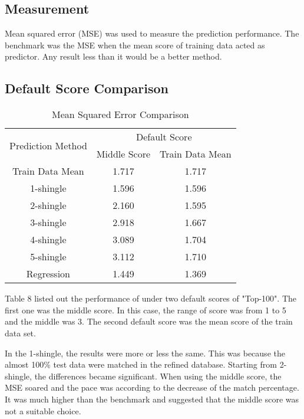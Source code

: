 \subsection{Measurement}
Mean squared error (MSE) was used to measure the prediction performance. The benchmark was the MSE when the mean score of training data acted as predictor. Any result less than it would be a better method.

\subsection{Default Score Comparison}

\begin{table}[H]
\caption{Mean Squared Error Comparison}
		\begin{tabular}{ccc}
			\toprule
				\multirow{2}{*}{Prediction Method} &
				\multicolumn{2}{c}{Default Score}\\
				\cline{2-3}
				& Middle Score & Train Data Mean \\
			\midrule
				Train Data Mean & 1.717 & 1.717 \\
				\hline
				1-shingle & 1.596 & 1.596\\
				2-shingle & 2.160 & 1.595\\
				3-shingle & 2.918 & 1.667\\
				4-shingle & 3.089 & 1.704\\
				5-shingle & 3.112 & 1.710\\
				\hline
				Regression & 1.449 & 1.369\\
				
			\bottomrule
		\end{tabular}

\end{table}

Table 8 listed out the performance of under two default scores of "Top-100". The first one was the middle score. In this case, the range of score was from 1 to 5 and the middle was 3. The second default score was the mean score of the train data set.

In the 1-shingle, the results were more or less the same. This was because the almost 100\% test data were matched in the refined database. 
Starting from 2-shingle, the differences became significant. When using the middle score, the MSE soared and the pace was according to the decrease of the match percentage. It was much higher than the benchmark and suggested that the middle score was not a suitable choice.


